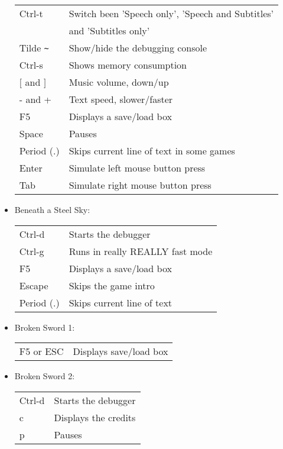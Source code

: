 \begin{itemize}
\begin{tabular}{ll}
    Ctrl-t                 & Switch been 'Speech only', 'Speech and Subtitles'\\
                           & and 'Subtitles only'\\
    Tilde \verb#~#         & Show/hide the debugging console\\
    Ctrl-s                 & Shows memory consumption\\
    $[$ and $]$                & Music volume, down/up\\
    - and +                & Text speed, slower/faster\\
    F5                     & Displays a save/load box\\
    Space                  & Pauses\\
    Period (.)             & Skips current line of text in some games\\
    Enter                  & Simulate left mouse button press\\
    Tab                    & Simulate right mouse button press\\
  \end{tabular}
\item Beneath a Steel Sky:\\
  \begin{tabular}{ll}
    Ctrl-d                 & Starts the debugger\\
    Ctrl-g                 & Runs in really REALLY fast mode\\
    F5                     & Displays a save/load box\\
    Escape                 & Skips the game intro\\
    Period (.)             & Skips current line of text\\
  \end{tabular}
\item Broken Sword 1:\\
  \begin{tabular}{ll}
    F5 or ESC              & Displays save/load box\\
  \end{tabular}
\item Broken Sword 2:\\
  \begin{tabular}{ll}
    Ctrl-d                 & Starts the debugger\\
    c                      & Displays the credits\\
    p                      & Pauses\\

\end{tabular}
\end{itemize}
